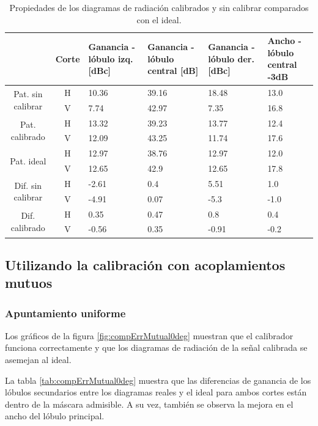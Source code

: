 \begin{table}[H]
  \footnotesize
  \centering
  \begin{tabular}{|c|c|p{2cm}|p{2.5cm}|p{2.5cm}|p{2.5cm}|}
    \cline{2-6}
    \multicolumn{1}{c|}{} & Corte & Ganancia - lóbulo izq. [dBc] & Ganancia - lóbulo central [dB] &
    Ganancia - lóbulo der. [dBc] & Ancho - lóbulo central -3dB \tabularnewline\hline
    \multirow{2}{2cm}{Pat. sin calibrar} & H & 10.36 & 39.16 & 18.48 & 13.0 \tabularnewline\cline{2-6}
     & V & 7.74 & 42.97 & 7.35 & 16.8 \tabularnewline\hline
    \multirow{2}{2cm}{Pat. calibrado} & H & 13.32 & 39.23 & 13.77 & 12.4 \tabularnewline\cline{2-6}
     & V & 12.09 & 43.25 & 11.74 & 17.6 \tabularnewline\hline
    \multirow{2}{2cm}{Pat. ideal} & H & 12.97 & 38.76 & 12.97 & 12.0 \tabularnewline\cline{2-6}
     & V & 12.65 & 42.9 & 12.65 & 17.8 \tabularnewline\hline
    \multirow{2}{2cm}{Dif. sin calibrar} & H & -2.61 & 0.4 & 5.51 & 1.0\tabularnewline\cline{2-6}
     & V & -4.91 & 0.07 & -5.3 & -1.0 \tabularnewline\hline
    \multirow{2}{2cm}{Dif. calibrado} & H & 0.35 & 0.47 & 0.8 & 0.4 \tabularnewline\cline{2-6}
     & V & -0.56 & 0.35 & -0.91 & -0.2 \tabularnewline\hline
  \end{tabular}
  \caption{Propiedades de los diagramas de radiación calibrados y sin calibrar comparados con el ideal.}
  \label{tab:compErrClassical10degRow}
\end{table}


\subsection{Utilizando la calibración con acoplamientos mutuos}

\subsubsection{Apuntamiento uniforme}

Los gráficos de la figura \ref{fig:compErrMutual0deg} muestran que el calibrador funciona correctamente y que los diagramas de 
radiación de la señal calibrada se asemejan al ideal. 

La tabla \ref{tab:compErrMutual0deg} muestra que las diferencias de ganancia de los lóbulos secundarios entre los diagramas 
reales y el ideal para ambos cortes están dentro de la máscara admisible. A su vez, también se observa la mejora en el ancho 
del lóbulo principal. 

